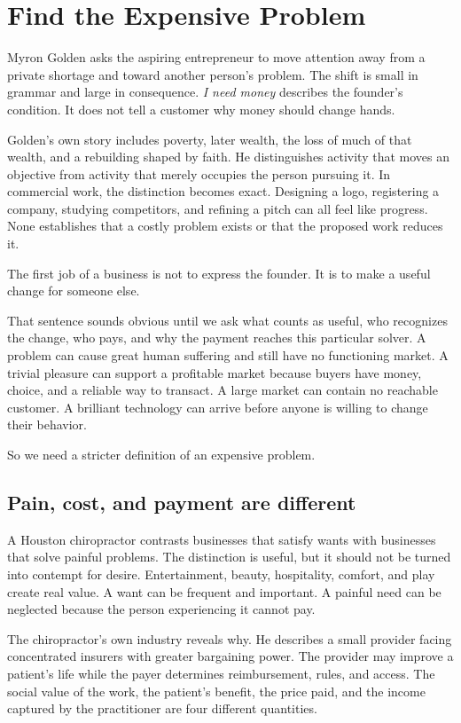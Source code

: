 \chapter{Find the Expensive Problem}

Myron Golden asks the aspiring entrepreneur to move attention away from a
private shortage and toward another person's problem. The shift is small in
grammar and large in consequence. \emph{I need money} describes the founder's
condition. It does not tell a customer why money should change hands.

Golden's own story includes poverty, later wealth, the loss of much of that
wealth, and a rebuilding shaped by faith. He distinguishes activity that moves
an objective from activity that merely occupies the person pursuing it. In
commercial work, the distinction becomes exact. Designing a logo, registering
a company, studying competitors, and refining a pitch can all feel like
progress. None establishes that a costly problem exists or that the proposed
work reduces it.

The first job of a business is not to express the founder. It is to make a
useful change for someone else.

That sentence sounds obvious until we ask what counts as useful, who recognizes
the change, who pays, and why the payment reaches this particular solver. A
problem can cause great human suffering and still have no functioning market.
A trivial pleasure can support a profitable market because buyers have money,
choice, and a reliable way to transact. A large market can contain no reachable
customer. A brilliant technology can arrive before anyone is willing to change
their behavior.

So we need a stricter definition of an expensive problem.

\section{Pain, cost, and payment are different}

A Houston chiropractor contrasts businesses that satisfy wants with businesses
that solve painful problems. The distinction is useful, but it should not be
turned into contempt for desire. Entertainment, beauty, hospitality, comfort,
and play create real value. A want can be frequent and important. A painful
need can be neglected because the person experiencing it cannot pay.

The chiropractor's own industry reveals why. He describes a small provider
facing concentrated insurers with greater bargaining power. The provider may
improve a patient's life while the payer determines reimbursement, rules, and
access. The social value of the work, the patient's benefit, the price paid,
and the income captured by the practitioner are four different quantities.

